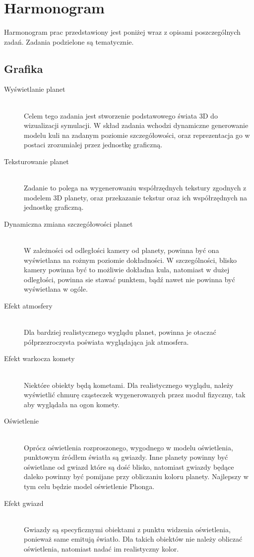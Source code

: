 \section{Harmonogram}\label{sec:harmonogram}

\paragraph{}

Harmonogram prac przedstawiony jest poniżej wraz z opisami poszczególnych zadań. Zadania podzielone są tematycznie.

\subsection{Grafika}

\begin{description}
	\item[Wyświetlanie planet] \hfill \\
	Celem tego zadania jest stworzenie podstawowego świata 3D do wizualizacji symulacji. W skład zadania wchodzi dynamiczne generowanie modelu kuli na zadanym poziomie szczegółowości, oraz reprezentacja go w postaci zrozumialej przez jednostkę graficzną.
	\item[Teksturowanie planet] \hfill \\
	Zadanie to polega na wygenerowaniu współrzędnych tekstury zgodnych z modelem 3D planety, oraz przekazanie tekstur oraz ich współrzędnych na jednostkę graficzną.
	\item[Dynamiczna zmiana szczegółowości planet] \hfill \\
	W zależności od odległości kamery od planety, powinna być ona wyświetlana na rożnym poziomie dokładności. W szczególności, blisko kamery powinna być to możliwie dokładna kula, natomiast w dużej odległości, powinna sie stawać punktem, bądź nawet nie powinna być wyświetlana w ogóle.
	\item[Efekt atmosfery] \hfill \\
	Dla bardziej realistycznego wyglądu planet, powinna je otaczać półprzezroczysta poświata wyglądająca jak atmosfera.
	\item[Efekt warkocza komety] \hfill \\
	Niektóre obiekty będą kometami. Dla realistycznego wyglądu, należy wyświetlić chmurę cząsteczek wygenerowanych przez moduł fizyczny, tak aby wyglądała na ogon komety.
	\item[Oświetlenie] \hfill \\
	Oprócz oświetlenia rozproszonego, wygodnego w modelu oświetlenia, punktowym źródłem światła są gwiazdy. Inne planety powinny być oświetlane od gwiazd które są dość blisko, natomiast gwiazdy będące daleko powinny być pomijane przy obliczaniu koloru planety. Najlepszy w tym celu będzie model oświetlenie Phonga.
	\item[Efekt gwiazd] \hfill \\
	Gwiazdy są specyficznymi obiektami z punktu widzenia oświetlenia, ponieważ same emitują światło. Dla takich obiektów nie należy obliczać oświetlenia, natomiast nadać im realistyczny kolor.
\end{description}

